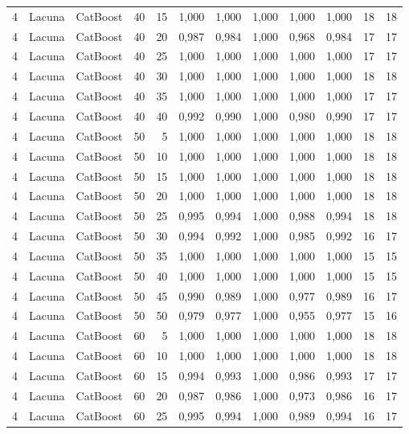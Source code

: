 \begin{longtable}{@{}rllrrrrrrrrr@{}}
4 & Lacuna & CatBoost & 40 & 15 & 1,000 & 1,000 & 1,000 & 1,000 & 1,000 & 18 & 18 \\
4 & Lacuna & CatBoost & 40 & 20 & 0,987 & 0,984 & 1,000 & 0,968 & 0,984 & 17 & 17 \\
4 & Lacuna & CatBoost & 40 & 25 & 1,000 & 1,000 & 1,000 & 1,000 & 1,000 & 17 & 17 \\
4 & Lacuna & CatBoost & 40 & 30 & 1,000 & 1,000 & 1,000 & 1,000 & 1,000 & 18 & 18 \\
4 & Lacuna & CatBoost & 40 & 35 & 1,000 & 1,000 & 1,000 & 1,000 & 1,000 & 17 & 17 \\
4 & Lacuna & CatBoost & 40 & 40 & 0,992 & 0,990 & 1,000 & 0,980 & 0,990 & 17 & 17 \\
4 & Lacuna & CatBoost & 50 & 5 & 1,000 & 1,000 & 1,000 & 1,000 & 1,000 & 18 & 18 \\
4 & Lacuna & CatBoost & 50 & 10 & 1,000 & 1,000 & 1,000 & 1,000 & 1,000 & 18 & 18 \\
4 & Lacuna & CatBoost & 50 & 15 & 1,000 & 1,000 & 1,000 & 1,000 & 1,000 & 18 & 18 \\
4 & Lacuna & CatBoost & 50 & 20 & 1,000 & 1,000 & 1,000 & 1,000 & 1,000 & 18 & 18 \\
4 & Lacuna & CatBoost & 50 & 25 & 0,995 & 0,994 & 1,000 & 0,988 & 0,994 & 18 & 18 \\
4 & Lacuna & CatBoost & 50 & 30 & 0,994 & 0,992 & 1,000 & 0,985 & 0,992 & 16 & 17 \\
4 & Lacuna & CatBoost & 50 & 35 & 1,000 & 1,000 & 1,000 & 1,000 & 1,000 & 15 & 15 \\
4 & Lacuna & CatBoost & 50 & 40 & 1,000 & 1,000 & 1,000 & 1,000 & 1,000 & 15 & 15 \\
4 & Lacuna & CatBoost & 50 & 45 & 0,990 & 0,989 & 1,000 & 0,977 & 0,989 & 16 & 17 \\
4 & Lacuna & CatBoost & 50 & 50 & 0,979 & 0,977 & 1,000 & 0,955 & 0,977 & 15 & 16 \\
4 & Lacuna & CatBoost & 60 & 5 & 1,000 & 1,000 & 1,000 & 1,000 & 1,000 & 18 & 18 \\
4 & Lacuna & CatBoost & 60 & 10 & 1,000 & 1,000 & 1,000 & 1,000 & 1,000 & 18 & 18 \\
4 & Lacuna & CatBoost & 60 & 15 & 0,994 & 0,993 & 1,000 & 0,986 & 0,993 & 17 & 17 \\
4 & Lacuna & CatBoost & 60 & 20 & 0,987 & 0,986 & 1,000 & 0,973 & 0,986 & 16 & 17 \\
4 & Lacuna & CatBoost & 60 & 25 & 0,995 & 0,994 & 1,000 & 0,989 & 0,994 & 16 & 17 \\

\end{longtable}
